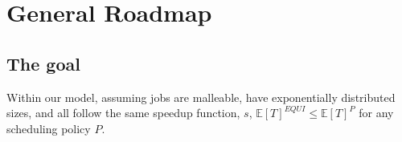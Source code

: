 \chapter{General Roadmap}\label{ch_roadmap}

\section{The goal}

\begin{theorem}\label{thm:EQUI_optimal}
    Within our model, assuming jobs are malleable, have exponentially distributed sizes,
and all follow the same speedup function, $s$, $\mathbb{E}[T]^{EQUI} \leq \mathbb{E}[T]^P$ for any scheduling policy $P$.
\end{theorem}

